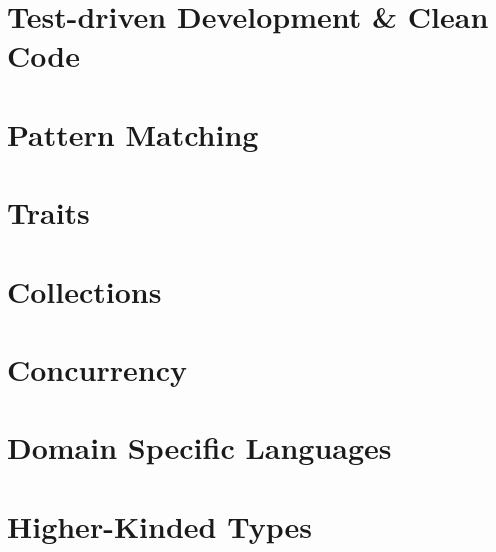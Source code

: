 \part[TDD \& Clean Code]{Test-driven Development \& Clean Code}
\part[Pattern Matching]{Pattern Matching}
\part[Traits]{Traits}
\part[Collections]{Collections}
\part[Concurrency]{Concurrency}
\part[DSLs]{Domain Specific Languages}
\part[Higher-Kinded Types]{Higher-Kinded Types}